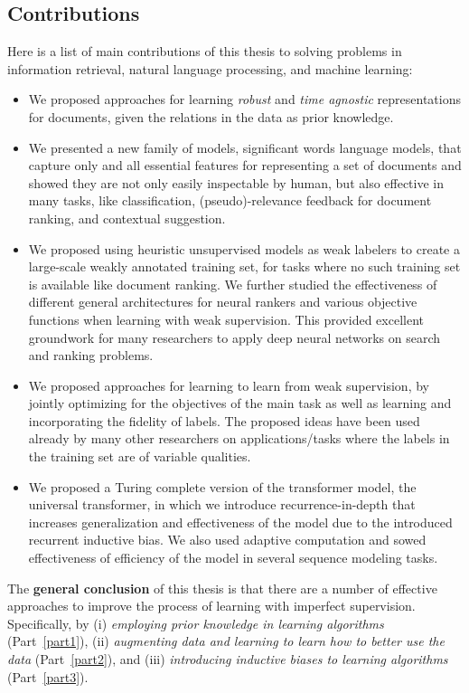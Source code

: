 \subsection{Contributions}
Here is a list of main contributions of this thesis to solving problems in information retrieval, natural language processing, and machine learning:
\begin{itemize}
    \item We proposed approaches for learning \emph{robust} and \emph{time agnostic} representations for documents, given the relations in the data as prior knowledge.
    \item We presented a new family of models, significant words language models, that capture only and all essential features for representing a set of documents and showed they are not only easily inspectable by human, but also effective in many tasks, like classification, (pseudo)-relevance feedback for document ranking, and contextual suggestion. 
    \item We proposed using heuristic unsupervised models as weak labelers to create a large-scale weakly annotated training set, for tasks where no such training set is available like document ranking. We further studied the effectiveness of different general architectures for neural rankers and various objective functions when learning with weak supervision. This provided excellent groundwork for many researchers to apply deep neural networks on search and ranking problems.
    \item We proposed approaches for learning to learn from weak supervision, by jointly optimizing for the objectives of the main task as well as learning and incorporating the fidelity of labels. The proposed ideas have been used already by many other researchers on applications/tasks where the labels in the training set are of variable qualities.  
    \item We proposed a Turing complete version of the transformer model, the universal transformer, in which we introduce recurrence-in-depth that increases generalization and effectiveness of the model due to the introduced recurrent inductive bias. We also used adaptive computation and sowed effectiveness of efficiency of the model in several sequence modeling tasks. 
\end{itemize}


\bigskip

The \textbf{general conclusion} of this thesis is that there are a number of effective approaches to improve the process of learning with imperfect supervision. Specifically, by  
(i) \emph{employing  prior knowledge in learning algorithms} (Part~\ref{part1}), 
(ii) \emph{augmenting data and learning to learn how to better use the data} (Part~\ref{part2}), and 
(iii) \emph{introducing inductive biases to learning algorithms} (Part~\ref{part3}).

